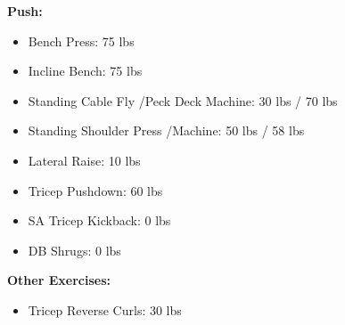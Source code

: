 \documentclass{article}
\begin{document}
\def\bp{75 }
\def\ib{75 }
\def\scf{30 }
\def\pdm{70 }
\def\ssp{50 }
\def\sspm{58 }
\def\lr{10 }
\def\tp{60 }
\def\satk{0 }
\def\dbs{0 }
\def\trc{30 }

\def\rdl{45 }
\def\gk{60 }
\def\lbe{160 }
\def\lp{160 }

\textbf{Push:}
\begin{itemize}
	\item Bench Press: \hfill\bp lbs
	\item Incline Bench: \hfill\ib lbs
	\item Standing Cable Fly \slash\space Peck Deck Machine: \hfill\scf lbs / \pdm lbs
	\item Standing Shoulder Press \slash\space Machine: \hfill\ssp lbs / \sspm lbs
	\item Lateral Raise: \hfill\lr lbs
	\item Tricep Pushdown: \hfill\tp lbs
	\item SA Tricep Kickback: \hfill\satk lbs
	\item DB Shrugs: \hfill\dbs lbs
\end{itemize}\leavevmode\newline

\textbf{Other Exercises:}
\begin{itemize}
	\item Tricep Reverse Curls: \hfill\trc lbs
\end{itemize}
\end{document}
